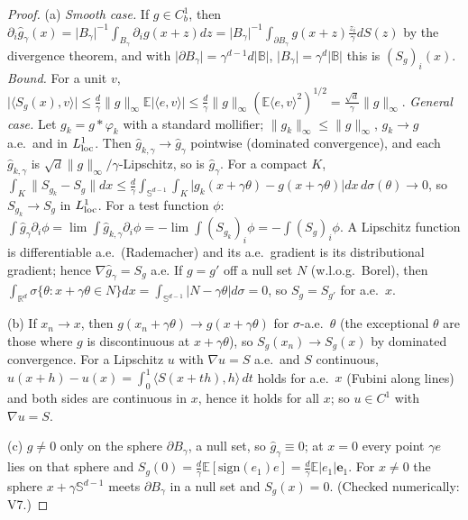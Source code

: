 \documentclass[11pt,a4paper]{article}
\numberwithin{equation}{section}
\theoremstyle{definition}
\theoremstyle{remark}
\newcommand{\E}{\mathbb E}\newcommand{\R}{\mathbb R}\newcommand{\N}{\mathbb N}\newcommand{\Prob}{\mathbb P}
\newcommand{\norm}[1]{\lVert #1\rVert}\newcommand{\abs}[1]{\lvert #1\rvert}\newcommand{\ip}[2]{\langle #1,#2\rangle}
\newcommand{\Sph}{\mathbb S^{d-1}}\newcommand{\Ball}{\mathbb B}
\begin{document}
\begin{proof}
(a) \emph{Smooth case.} If $g\in C^1_b$, then $\partial_i\hat g_\gamma(x)=\abs{B_\gamma}^{-1}\int_{B_\gamma}\partial_ig(x+z)dz=\abs{B_\gamma}^{-1}\int_{\partial B_\gamma}g(x+z)\frac{z_i}\gamma dS(z)$ by the divergence theorem, and with $\abs{\partial B_\gamma}=\gamma^{d-1}d\abs{\Ball}$, $\abs{B_\gamma}=\gamma^d\abs\Ball$ this is $(S_g)_i(x)$.
\emph{Bound.} For a unit $v$, $\abs{\ip{S_g(x)}v}\le\frac d\gamma\norm g_\infty\E\abs{\ip ev}\le\frac d\gamma\norm g_\infty(\E\ip ev^2)^{1/2}=\frac{\sqrt d}\gamma\norm g_\infty$.
\emph{General case.} Let $g_k=g*\varphi_k$ with a standard mollifier; $\norm{g_k}_\infty\le\norm g_\infty$, $g_k\to g$ a.e.\ and in $L^1_{\rm loc}$. Then $\hat g_{k,\gamma}\to\hat g_\gamma$ pointwise (dominated convergence), and each $\hat g_{k,\gamma}$ is $\sqrt d\norm g_\infty/\gamma$-Lipschitz, so is $\hat g_\gamma$. For a compact $K$,
$\int_K\norm{S_{g_k}-S_g}dx\le\frac d\gamma\int_{\Sph}\int_K\abs{g_k(x+\gamma\theta)-g(x+\gamma\theta)}dx\,d\sigma(\theta)\to0$, so $S_{g_k}\to S_g$ in $L^1_{\rm loc}$. For a test function $\phi$:
$\int\hat g_\gamma\partial_i\phi=\lim\int\hat g_{k,\gamma}\partial_i\phi=-\lim\int(S_{g_k})_i\phi=-\int(S_g)_i\phi$. A Lipschitz function is differentiable a.e.\ (Rademacher) and its a.e.\ gradient is its distributional gradient; hence $\nabla\hat g_\gamma=S_g$ a.e.
If $g=g'$ off a null set $N$ (w.l.o.g.\ Borel), then $\int_{\R^d}\sigma\{\theta:x+\gamma\theta\in N\}dx=\int_{\Sph}\abs{N-\gamma\theta}d\sigma=0$, so $S_g=S_{g'}$ for a.e.\ $x$.

(b) If $x_n\to x$, then $g(x_n+\gamma\theta)\to g(x+\gamma\theta)$ for $\sigma$-a.e.\ $\theta$ (the exceptional $\theta$ are those where $g$ is discontinuous at $x+\gamma\theta$), so $S_g(x_n)\to S_g(x)$ by dominated convergence. For a Lipschitz $u$ with $\nabla u=S$ a.e.\ and $S$ continuous, $u(x+h)-u(x)=\int_0^1\ip{S(x+th)}h\,dt$ holds for a.e.\ $x$ (Fubini along lines) and both sides are continuous in $x$, hence it holds for all $x$; so $u\in C^1$ with $\nabla u=S$.

(c) $g\ne0$ only on the sphere $\partial B_\gamma$, a null set, so $\hat g_\gamma\equiv0$; at $x=0$ every point $\gamma e$ lies on that sphere and $S_g(0)=\frac d\gamma\E[\mathrm{sign}(e_1)e]=\frac d\gamma\E\abs{e_1}\mathbf e_1$. For $x\ne0$ the sphere $x+\gamma\Sph$ meets $\partial B_\gamma$ in a null set and $S_g(x)=0$. (Checked numerically: V7.)
\end{proof}
\end{document}
